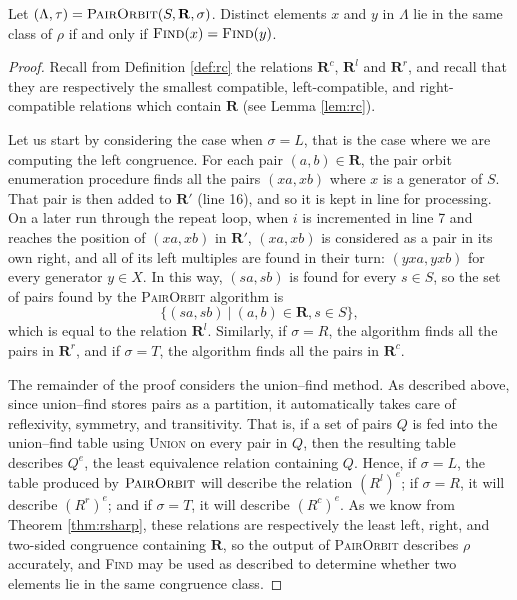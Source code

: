 \begin{theorem}
  \label{thm:p}
  Let $(\Lambda, \tau) = \textsc{PairOrbit}(S, \mathbf{R}, \sigma)$.  Distinct elements
  $x$ and $y$ in $\Lambda$ lie in the same class of $\rho$ if and only if
  $\textsc{Find}(x) = \textsc{Find}(y)$.
  \begin{proof}
    Recall from Definition \ref{def:rc} the relations $\mathbf{R}^c$,
    $\mathbf{R}^l$ and $\mathbf{R}^r$, and recall that they are respectively the
    smallest compatible, left-compatible, and right-compatible relations which
    contain $\mathbf{R}$ (see Lemma \ref{lem:rc}).

    Let us start by considering the case when $\sigma = L$, that is the case
    where we are computing the left congruence.  For each pair
    $(a,b) \in \mathbf{R}$, the pair orbit enumeration procedure finds all the
    pairs $(xa, xb)$ where $x$ is a generator of $S$.  That pair is then added
    to $\mathbf{R}'$ (line 16), and so it is kept in line for processing.  On a
    later run through the repeat loop, when $i$ is incremented in line 7 and
    reaches the position of $(xa, xb)$ in $\mathbf{R}'$, $(xa, xb)$ is
    considered as a pair in its own right, and all of its left multiples are
    found in their turn: $(yxa, yxb)$ for every generator $y \in X$.  In this
    way, $(sa, sb)$ is found for every
    $s \in S$, so the set of pairs found by the \textsc{PairOrbit} algorithm is
    $$\{(sa, sb) ~|~ (a,b) \in \mathbf{R}, s \in S\},$$
    which is equal to the relation $\mathbf{R}^l$.
    Similarly, if $\sigma = R$, the algorithm finds all the pairs in
    $\mathbf{R}^r$, and if $\sigma = T$, the algorithm finds all the pairs in
    $\mathbf{R}^c$.

    The remainder of the proof considers the union--find method.  As described
    above, since union--find stores pairs as a partition, it automatically takes
    care of reflexivity, symmetry, and transitivity.  That is, if a set of pairs
    $Q$ is fed into the union--find table using \textsc{Union} on every pair in
    $Q$, then the resulting table describes $Q^e$, the least equivalence
    relation containing $Q$.  Hence, if $\sigma = L$, the table produced by
    $\textsc{PairOrbit}$ will describe the relation $(R^l)^e$; if $\sigma = R$, it will
    describe $(R^r)^e$; and if $\sigma = T$, it will describe $(R^c)^e$.  As we
    know from Theorem \ref{thm:rsharp}, these relations are respectively the least
    left, right, and two-sided congruence containing $\mathbf{R}$, so the output
    of \textsc{PairOrbit} describes $\rho$ accurately, and \textsc{Find} may be used as
    described to determine whether two elements lie in the same congruence class.
  \end{proof}
\end{theorem}

